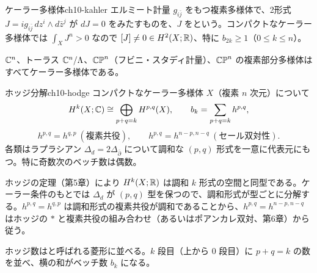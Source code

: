 \begin{mydef}{ケーラー多様体}{ch10-kahler}
エルミート計量 $g_{i\bar j}$ をもつ複素多様体で、2形式 $J=ig_{i\bar j}\,dz^i\wedge d\bar z^j$ が $dJ=0$ をみたすものを、$J$ をという。コンパクトなケーラー多様体では $\int_XJ^n>0$ なので $[J]\neq0\in H^2(X;\mathbb{R})$、特に $b_{2k}\ge1$（$0\le k\le n$）。
\end{mydef}
$\mathbb{C}^n$、トーラス $\mathbb{C}^n/\Lambda$、$\mathbb{CP}^n$（フビニ・スタディ計量）、$\mathbb{CP}^n$ の複素部分多様体はすべてケーラー多様体である。

\begin{mythm}{ホッジ分解}{ch10-hodge}
コンパクトなケーラー多様体 $X$（複素 $n$ 次元）について
\[
H^k(X;\mathbb{C})\cong\bigoplus_{p+q=k}H^{p,q}(X),\qquad b_k=\sum_{p+q=k}h^{p,q},
\]
\[
h^{p,q}=h^{q,p}\ (\text{複素共役}),\qquad h^{p,q}=h^{n-p,n-q}\ (\text{セール双対性}).
\]
各類はラプラシアン $\Delta_d=2\Delta_{\bar\partial}$ について調和な $(p,q)$ 形式を一意に代表元にもつ。特に奇数次のベッチ数は偶数。
\end{mythm}
\begin{note}
ホッジの定理（第5章）により $H^k(X;\mathbb{R})$ は調和 $k$ 形式の空間と同型である。ケーラー条件のもとでは $\Delta_d$ が $(p,q)$ 型を保つので、調和形式が型ごとに分解する。$h^{p,q}=h^{q,p}$ は調和形式の複素共役が調和であることから、$h^{p,q}=h^{n-p,n-q}$ はホッジの $*$ と複素共役の組み合わせ（あるいはポアンカレ双対、第6章）から従う。
\end{note}

ホッジ数はと呼ばれる菱形に並べる。$k$ 段目（上から $0$ 段目）に $p+q=k$ の数を並べ、横の和がベッチ数 $b_k$ になる。

\begin{center}
\end{center}

